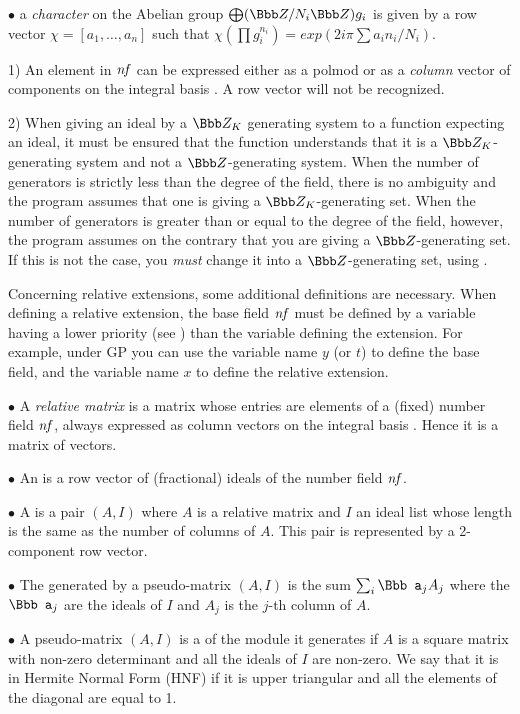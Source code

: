 $\bullet$ a \emph{character} on the Abelian group
$\bigoplus (\Z/N_i\Z) g_i$
is given by a row vector $\chi = [a_1,\ldots,a_n]$ such that
$\chi(\prod g_i^{n_i}) = exp(2i\pi\sum a_i n_i / N_i)$.



1) An element in $\hbox{\it nf\/}$ can be expressed either as a polmod or as a
\emph{column} vector of components on the integral basis .
A row vector will not be recognized.

2) When giving an ideal by a $\Z_K$ generating system to a function expecting
an ideal, it must be ensured that the function understands that it is a
$\Z_K$-generating system and not a $\Z$-generating system. When the number of
generators is strictly less than the degree of the field, there is no
ambiguity and the program assumes that one is giving a $\Z_K$-generating set.
When the number of generators is greater than or equal to the degree of the
field, however, the program assumes on the contrary that you are giving a
$\Z$-generating set. If this is not the case, you \emph{must} change it into
a $\Z$-generating set, using .

Concerning relative extensions, some additional definitions are necessary.
When defining a relative extension, the base field $\hbox{\it nf\/}$ must be defined
by a variable having a lower priority (see ) than the
variable defining the extension. For example, under GP you can use the
variable name $y$ (or $t$) to define the base field, and the variable name
$x$ to define the relative extension.

$\bullet$ A \emph{relative matrix} is a matrix whose entries are
elements of a (fixed) number field $\hbox{\it nf\/}$, always expressed as column
vectors on the integral basis . Hence it is a matrix of
vectors.

$\bullet$ An  is a row vector of (fractional)
ideals of the number field $\hbox{\it nf\/}$.

$\bullet$ A  is a pair $(A,I)$ where $A$ is a
relative matrix and $I$ an ideal list whose length is the same as the number
of columns of $A$. This pair is represented by a 2-component row vector.

$\bullet$ The  generated by a pseudo-matrix $(A,I)$ is
the sum $\sum_i {\Bbb a}_j A_j$ where the ${\Bbb a}_j$ are the ideals of $I$
and $A_j$ is the $j$-th column of $A$.

$\bullet$ A pseudo-matrix $(A,I)$ is a  of the module
it generates if $A$ is a square matrix with non-zero determinant and all the
ideals of $I$ are non-zero. We say that it is in Hermite Normal
Form (HNF) if it is upper triangular and all the
elements of the diagonal are equal to 1.

